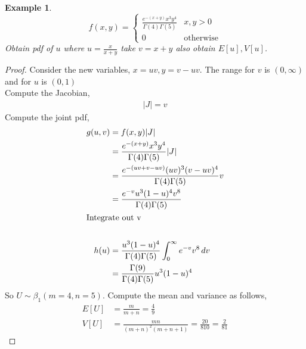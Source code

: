 \documentclass[oneside,11pt,pdftex]{book}%
\numberwithin{equation}{section}
\newtheorem{example}[theorem]{Example}
\numberwithin{section}{chapter}
\numberwithin{equation}{chapter}
\begin{document}
\begin{example}
	\[ f(x,y)=\begin{cases}
		\frac{e^{-(x+y)}x^3y^4}{\Gamma(4)\Gamma(5)} & x,y>0\\
		0 & \text{otherwise}
	\end{cases} \]
Obtain pdf of $ u $ where $ u=\frac{x}{x+y} $ take $ v=x+y $ also obtain $ E[u],V[u] $.
\end{example}
\begin{proof}
	Consider the new variables,
	$ x=uv, y=v-uv $. The range for $v $ is $ (0,\infty) $ and for $ u $ is $ (0,1) $\\
	Compute the Jacobian,
	\begin{align*}
		|J|=v
	\end{align*}
	Compute the joint pdf,
	\begin{align*}
		g(u,v)&=f(x,y)|J|\\
		&=\frac{e^{-(x+y)}x^3y^4}{\Gamma(4)\Gamma(5)} |J|\\
		&=\frac{e^{-(uv+v-uv)}(uv)^3(v-uv)^4}{\Gamma(4)\Gamma(5)} v\\
		&= \frac{e^{-v}u^3(1-u)^{4}v^8}{\Gamma(4)\Gamma(5)}\\
		\intertext{Integrate out v}\\
		h(u)&=\frac{u^3(1-u)^{4}}{\Gamma(4)\Gamma(5)} \int_0^\infty e^{-v}v^8 \, dv\\
		&=\frac{\Gamma(9)}{\Gamma(4)\Gamma(5)}u^3 (1-u)^4\\
	\end{align*}
So $ U \sim \beta_1(m=4,n=5)$. Compute the mean and variance as follows,
\begin{align*}
	E[U]&=\frac{m}{m+n}=\frac{4}{9}\\
	V[U]&=\frac{mn}{(m+n)^2(m+n+1)}=\frac{20}{810}=\frac{2}{81}
\end{align*}
\end{proof}
\end{document}
